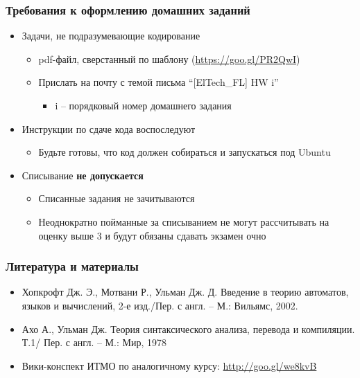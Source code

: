 \documentclass{beamer}
\begin{document}
\begin{frame}[fragile]
  \transwipe[direction=90]
  \frametitle{Требования к оформлению домашних заданий}
  \begin{itemize}
    \item Задачи, не подразумевающие кодирование
    \begin{itemize}
      \item pdf-файл, сверстанный по 
шаблону (\href{https://goo.gl/PR2QwI}{https://goo.gl/PR2QwI})
      \item Прислать на почту с темой письма ``[ElTech\_FL] HW i''
      \begin{itemize}
        \item i -- порядковый номер домашнего задания
      \end{itemize}
    \end{itemize}
    \item Инструкции по сдаче кода воспоследуют
    \begin{itemize}
      \item Будьте готовы, что код должен собираться и запускаться под Ubuntu
    \end{itemize}
    \item Списывание \textbf{не допускается}
    \begin{itemize}
      \item Списанные задания не зачитываются
      \item Неоднократно пойманные за списыванием не могут рассчитывать на оценку выше 3 и будут обязаны сдавать экзамен очно
    \end{itemize}
  \end{itemize}
\end{frame}

\begin{frame}[fragile]
  \transwipe[direction=90]
  \frametitle{Литература и материалы}
  \begin{itemize}
    \item Хопкрофт Дж. Э., Мотвани Р., Ульман Дж. Д. Введение в теорию автоматов, языков и вычислений, 2-е изд./Пер. с англ. – М.: Вильямс, 2002.
    \item Ахо А., Ульман Дж. Теория синтаксического анализа, перевода и компиляции. Т.1/ Пер. с англ. – М.: Мир, 1978
    \item Вики-конспект ИТМО по аналогичному курсу: \href{http://goo.gl/we8kvB}{http://goo.gl/we8kvB}
  \end{itemize}
\end{frame}
\end{document}

